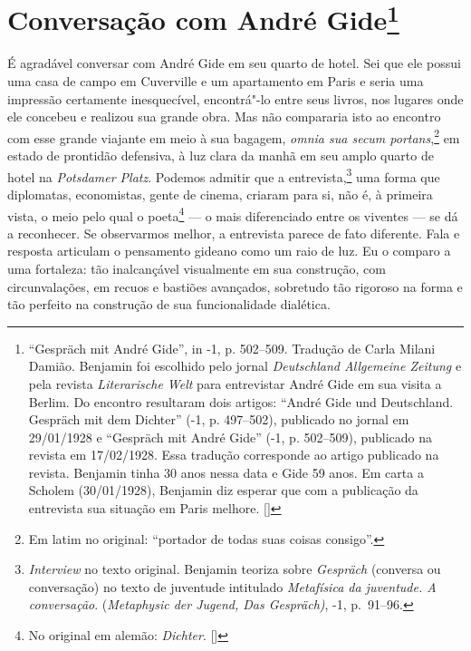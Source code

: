 \chapter{Conversação com André Gide\footnote[*]{``Gespräch mit André Gide'', in -1, p. 502--509. Tradução de Carla Milani Damião. Benjamin
  foi escolhido pelo jornal \emph{Deutschland Allgemeine Zeitung} e pela
  revista \emph{Literarische Welt} para entrevistar André Gide em sua
  visita a Berlim. Do encontro resultaram dois artigos: ``André Gide
  und Deutschland. Gespräch mit dem Dichter'' (-1, p. 497--502),
  publicado no jornal em 29/01/1928 e ``Gespräch mit André Gide''
  (-1, p. 502--509), publicado na revista em 17/02/1928. Essa
  tradução corresponde ao artigo publicado na revista. Benjamin tinha 30
  anos nessa data e Gide 59 anos. Em carta a Scholem (30/01/1928),
  Benjamin diz esperar que com a publicação da entrevista sua situação
  em Paris melhore. []}}

É agradável conversar com André Gide em seu quarto de hotel. Sei que ele possui uma casa de campo em Cuverville e um
apartamento em Paris e seria uma impressão certamente inesquecível,
encontrá"-lo entre seus livros, nos lugares onde ele concebeu e realizou
sua grande obra. Mas não compararia isto ao encontro com esse grande
viajante em meio à sua bagagem, \emph{omnia sua secum portans},\footnote{Em latim no original: ``portador de todas suas coisas consigo''. \versal{[N.~T.]}} em
estado de prontidão defensiva, à luz clara da manhã em seu amplo quarto
de hotel na \emph{Potsdamer Platz}. Podemos admitir que a entrevista,\footnote{\emph{Interview} no texto original.
  Benjamin teoriza sobre \emph{Gespräch} (conversa ou conversação) no
  texto de juventude intitulado \emph{Metafísica da juventude. A
  conversação}. (\emph{Metaphysic der Jugend, Das Gespräch)},
  -1, p.~91--96. \versal{[N.~T.]}} uma forma que diplomatas, economistas, gente de cinema, criaram
para si, não é, à primeira vista, o meio pelo qual o poeta\footnote{No original em alemão: \emph{Dichter}. []} --- o mais diferenciado entre os viventes --- se dá a
reconhecer. Se observarmos melhor, a entrevista parece de fato
diferente. Fala e resposta articulam o pensamento gideano como um raio
de luz. Eu o comparo a uma fortaleza: tão inalcançável visualmente em
sua construção, com circunvalações, em recuos e bastiões avançados,
sobretudo tão rigoroso na forma e tão perfeito na construção de sua
funcionalidade dialética.

